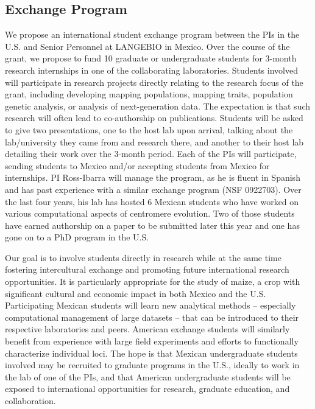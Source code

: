 
\subsection*{Exchange Program} 

We propose an international student exchange program between the PIs in the U.S. and Senior Personnel at LANGEBIO in Mexico. Over the course of the grant, we propose to fund 10 graduate or undergraduate students for 3-month research internships in one of the collaborating laboratories. Students involved will participate in research projects directly relating to the research focus of the grant, including developing mapping populations, mapping traits, population genetic analysis, or analysis of next-generation data. The expectation is that such research will often lead to co-authorship on publications. Students will be asked to give two presentations, one to the host lab upon arrival, talking about the lab/university they came from and research there, and another to their host lab detailing their work over the 3-month period.  Each of the PIs will participate, sending students to Mexico and/or accepting students from Mexico for internships. PI Ross-Ibarra will manage the program, as he is fluent in Spanish and has past experience with a similar exchange program (NSF 0922703). Over the last four years, his lab has hosted 6 Mexican students who have worked on various computational aspects of centromere evolution. Two of those students have earned authorship on a paper to be submitted later this year and one has gone on to a PhD program in the U.S.

Our goal is to involve students directly in research while at the same time fostering intercultural exchange and promoting future international research opportunities. It is particularly appropriate for the study of maize, a crop with significant cultural and economic impact in both Mexico and the U.S. Participating Mexican students will learn new analytical methods -- especially computational management of large datasets -- that can be introduced to their respective laboratories and peers. American exchange students will similarly benefit from experience with large field experiments and efforts to functionally characterize individual loci.  The hope is that Mexican undergraduate students involved may be recruited to graduate programs in the U.S., ideally to work in the lab of one of the PIs, and that American undergraduate students will be exposed to international opportunities for research, graduate education, and collaboration.

